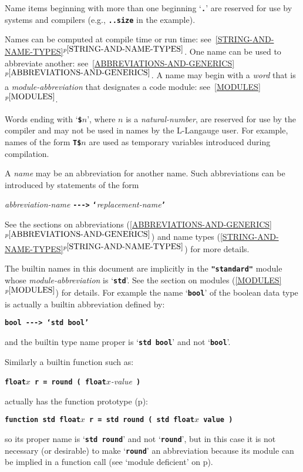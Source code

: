 \documentclass[12pt]{article}
\newcommand{\TT}[1]{{\tt \bfseries #1}}
\newcommand{\itemref}[1]{\ref{#1}$^{p\pageref{#1}}$}
\newcommand{\pagref}[1]{p\pageref{#1}}
\newcommand{\TMP}{\$}
\begin{document}
Name items beginning with more than one beginning `\TT{.}' are reserved
for use by systems and compilers (e.g., \TT{..size} in the example).

Names can be computed at compile time or run time:
see~\itemref{STRING-AND-NAME-TYPES}.
One name can be used to abbreviate another:
see~\itemref{ABBREVIATIONS-AND-GENERICS}.
A name may begin with a {\em word} that is a {\em module-abbreviation}
that designates a code module: see~\itemref{MODULES}.

Words ending with `\TT{\TMP$n$}', where $n$ is a {\em natural-number}, are
reserved for use by the compiler and may not be used in names by the
L-Langauge user.  For example, names of the form \TT{T\TMP$n$} are used as
temporary variables introduced during compilation.

A {\em name} may be an abbreviation for another name.  Such abbreviations
can be introduced by statements of the form
\begin{center}
{\em abbreviation-name} \TT{-{}-{}->} \TT{`}{\em replacement-name}\TT{'}
\end{center}
See the sections on abbreviations
(\itemref{ABBREVIATIONS-AND-GENERICS})
and name types
(\itemref{STRING-AND-NAME-TYPES})
for more details.

The builtin names in this document are implicitly in the
\TT{"standard"} module whose {\em module-abbreviation} is `\TT{std}'.
See the section on modules (\itemref{MODULES}) for details.
For example the name `\TT{bool}' of the boolean data type is actually a builtin
abbreviation defined by:
\begin{center}
\TT{bool {-{}-{}->} `std bool'}
\end{center}
and the builtin type name proper is `\TT{std bool}' and not `\TT{bool}'.

Similarly a builtin function such as:
\begin{center}
\TT{float$x$ r = round ( float$x$}{\em -value}\TT{ )} \\
\end{center}
actually has the function prototype (\pagref{FUNCTION-PROTOTYPE}):
\begin{center}
\TT{function std float$x$ r = std round ( std float$x$ value )} \\
\end{center}
so its proper name is `\TT{std round}' and not `\TT{round}',
but in this case it is not necessary (or desirable) to make `\TT{round}'
an abbreviation because its module can be implied in a function call
(see `module deficient' on \pagref{MODULE-DEFICIENT}).
\end{document}
